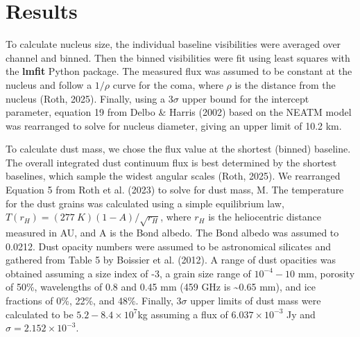 \section{Results}\label{results}

To calculate nucleus size, the individual baseline visibilities were averaged over channel and binned. Then the binned visibilities were fit using least squares with the \textbf{lmfit} Python package. The measured flux was assumed to be constant at the nucleus and follow a \(1/\rho\) curve for the coma, where \(\rho\) is the distance from the nucleus (Roth, 2025).  Finally, using a \(3\sigma\) upper bound for the intercept parameter, equation 19 from Delbo \& Harris (2002) based on the NEATM model was rearranged to solve for nucleus diameter, giving an upper limit of 10.2 km.

To calculate dust mass, we chose the flux value at the shortest (binned) baseline. The overall integrated dust continuum flux is best determined by the shortest baselines, which sample the widest angular scales (Roth, 2025). We rearranged Equation 5 from Roth et al. (2023) to solve for dust mass, M. The temperature for the dust grains was calculated using a simple equilibrium law, \(T\left( r_{H} \right) = (277\ K)(1 - A)/\sqrt{r_{H}}\), where \(r_{H}\) is the heliocentric distance measured in AU, and A is the Bond albedo. The Bond albedo was assumed to 0.0212. Dust opacity numbers were assumed to be astronomical silicates and gathered from Table 5 by Boissier et al. (2012). A range of dust opacities was obtained assuming a size index of -3, a grain size range of \(10^{- 4} - 10\) mm, porosity of 50\%, wavelengths of 0.8 and 0.45 mm (459 GHz is \textasciitilde0.65 mm), and ice fractions of 0\%, 22\%, and 48\%. Finally, \(3\sigma\) upper limits of dust mass were calculated to be \(5.2 - 8.4 \times 10^{7}\)kg assuming a flux of \(6.037 \times 10^{- 3}\) Jy and \(\sigma = 2.152 \times 10^{- 3}\).
